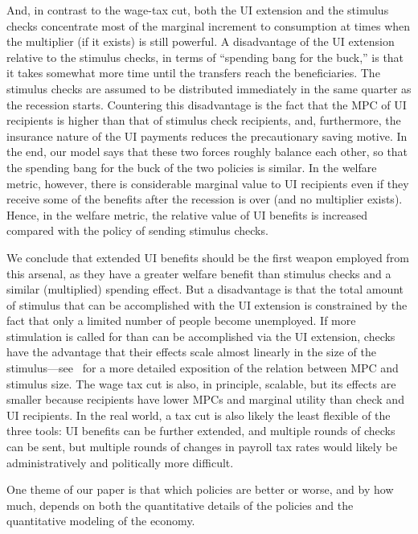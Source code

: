 \documentclass[qe]{econsocart}
\begin{document}
And, in contrast to the wage-tax cut, both the UI extension and the stimulus checks concentrate most of the marginal increment to consumption at times when the multiplier (if it exists) is still powerful.  A disadvantage of the UI extension relative to the stimulus checks, in terms of ``spending bang for the buck,'' is that it takes somewhat more time until the transfers reach the beneficiaries. The stimulus checks are assumed to be distributed immediately in the same quarter as the recession starts. Countering this disadvantage is the fact that the MPC of UI recipients is higher than that of stimulus check recipients, and, furthermore, the insurance nature of the UI payments reduces the precautionary saving motive. In the end, our model says that these two forces roughly balance each other, so that the spending bang for the buck of the two policies is similar. In the welfare metric, however, there is considerable marginal value to UI recipients even if they receive some of the benefits after the recession is over (and no multiplier exists). Hence, in the welfare metric, the relative value of UI benefits is increased compared with the policy of sending stimulus checks.

We conclude that extended UI benefits should be the first weapon employed from this arsenal, as they have a greater welfare benefit than stimulus checks and a similar (multiplied) spending effect.  But a disadvantage is that the total amount of stimulus that can be accomplished with the UI extension is constrained by the fact that only a limited number of people become unemployed.  If more stimulation is called for than can be accomplished via the UI extension, checks have the advantage that their effects scale almost linearly in the size of the stimulus---see~\cite{beraja2023size} for a more detailed exposition of the relation between MPC and stimulus size.  The wage tax cut is also, in principle, scalable, but its effects are smaller because recipients have lower MPCs and marginal utility than check and UI recipients.  In the real world, a tax cut is also likely the least flexible of the three tools:  UI benefits can be further extended, and multiple rounds of checks can be sent, but multiple rounds of changes in payroll tax rates would likely be administratively and politically more difficult.

One theme of our paper is that which policies are better or worse, and by how much, depends on both the quantitative details of the policies and the quantitative modeling of the economy.
\end{document}
